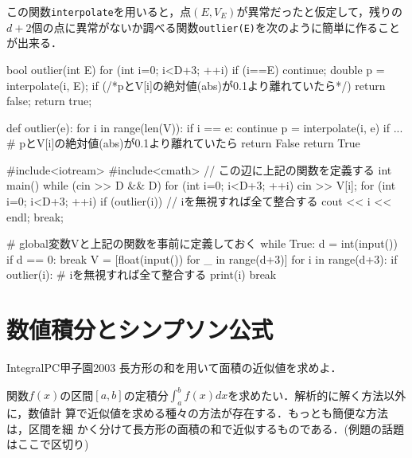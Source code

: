 \begin{versionbeta}
この関数\texttt{interpolate}を用いると，点$(E,V_E)$が異常だったと仮定して，残りの$d+2$個の点に異常がないか調べる関数\texttt{outlier(E)}を次のように簡単に作ることが出来る．

\begin{cbox}[emph={outlier},emph={[2]interpolate}]
bool outlier(int E) {
    for (int i=0; i<D+3; ++i) {
        if (i==E) continue;
        double p = interpolate(i, E);
        if (/*pとV[i]の絶対値(abs)が0.1より離れていたら*/)
            return false;
    }
    return true;
}
\end{cbox}

\begin{pybox}[emph={outlier},emph={[2]interpolate}]
def outlier(e):
    for i in range(len(V)):
        if i == e:
            continue 
        p = interpolate(i, e)
        if ... # pとV[i]の絶対値(abs)が0.1より離れていたら
            return False 
    return True  
\end{pybox}

\begin{cbox}[emph={},emph={[2]outlier,interpolate}]
#include<iotream>
#include<cmath>
// この辺に上記の関数を定義する
int main() {
    while (cin >> D && D) {
        for (int i=0; i<D+3; ++i) cin >> V[i];
        for (int i=0; i<D+3; ++i)
            if (outlier(i)) { // iを無視すれば全て整合する
                cout << i << endl;
                break;
            }
    }
}
\end{cbox}

\begin{pybox}[emph={},emph={[2]outlier,interpolate}]
# global変数Vと上記の関数を事前に定義しておく  
while True:
  d = int(input())
  if d == 0:
      break 
  V = [float(input()) for _ in range(d+3)]
  for i in range(d+3):
      if outlier(i): # iを無視すれば全て整合する
          print(i)
          break  
\end{pybox}

\section{数値積分とシンプソン公式}\label{section:numerical-integration}

\begin{psbox}{Integral}{PC甲子園2003}
長方形の和を用いて面積の近似値を求めよ．

\end{psbox}

関数$f(x)$の区間$[a,b]$の定積分$\displaystyle\int_a^b f(x) dx$を求めたい．解析的に解く方法以外に，数値計
算で近似値を求める種々の方法が存在する．もっとも簡便な方法は，区間を細
かく分けて長方形の面積の和で近似するものである．(例題の話題はここで区切り)


\end{versionbeta}
